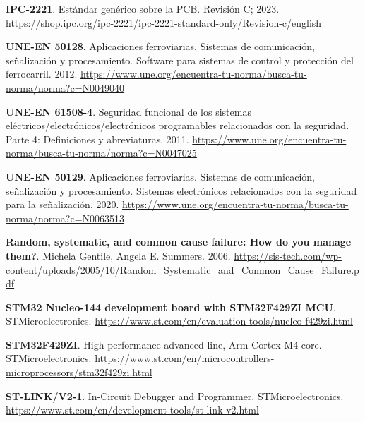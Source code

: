 \begin{thebibliography}{30}
\textbf{IPC-2221}. Estándar genérico sobre la PCB. Revisión C; 2023. \href{https://shop.ipc.org/ipc-2221/ipc-2221-standard-only/Revision-c/english}{https://shop.ipc.org/ipc-2221/ipc-2221-standard-only/Revision-c/english}

\textbf{UNE-EN 50128}. Aplicaciones ferroviarias. Sistemas de comunicación, señalización y procesamiento. Software para sistemas de control y protección del ferrocarril. 2012. \href{https://www.une.org/encuentra-tu-norma/busca-tu-norma/norma?c=N0049040}{https://www.une.org/encuentra-tu-norma/busca-tu-norma/norma?c=N0049040} 


\textbf{UNE-EN 61508-4}. Seguridad funcional de los sistemas eléctricos/electrónicos/electrónicos programables relacionados con la seguridad. Parte 4: Definiciones y abreviaturas. 2011. \href{https://www.une.org/encuentra-tu-norma/busca-tu-norma/norma?c=N0047025}{https://www.une.org/encuentra-tu-norma/busca-tu-norma/norma?c=N0047025} 

\textbf{UNE-EN 50129}. Aplicaciones ferroviarias. Sistemas de comunicación, señalización y procesamiento. Sistemas electrónicos relacionados con la seguridad para la señalización. 2020. \href{https://www.une.org/encuentra-tu-norma/busca-tu-norma/norma?c=N0063513}{https://www.une.org/encuentra-tu-norma/busca-tu-norma/norma?c=N0063513} 


\textbf{Random, systematic, and common cause failure: How do you manage them?}. Michela Gentile, Angela E. Summers. 2006. \href{https://sis-tech.com/wp-content/uploads/2005/10/Random_Systematic_and_Common_Cause_Failure.pdf}{https://sis-tech.com/wp-content/uploads/2005/10/Random\_Systematic\_and\_Common\_Cause\_Failure.pdf} 

\textbf{STM32 Nucleo-144 development board with STM32F429ZI MCU}. STMicroelectronics. \href{https://www.st.com/en/evaluation-tools/nucleo-f429zi.html}{https://www.st.com/en/evaluation-tools/nucleo-f429zi.html} 

\textbf{STM32F429ZI}. High-performance advanced line, Arm Cortex-M4 core. STMicroelectronics. \href{https://www.st.com/en/microcontrollers-microprocessors/stm32f429zi.html}{https://www.st.com/en/microcontrollers-microprocessors/stm32f429zi.html} 

\textbf{ST-LINK/V2-1}. In-Circuit Debugger and Programmer. STMicroelectronics.
\href{https://www.st.com/en/development-tools/st-link-v2.html}{https://www.st.com/en/development-tools/st-link-v2.html}


\end{thebibliography}
